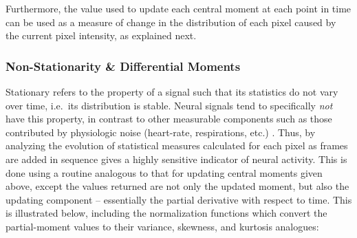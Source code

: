 \documentclass[../main.tex]{subfiles}
\begin{document}



Furthermore, the value used to update each central moment at each point in time can be used as a measure of change in the distribution of each pixel caused by the current pixel intensity, as explained next.

\subsubsection{
	Non-Stationarity \& Differential Moments}\label{non-stationarity-differential-moments}

Stationary refers to the property of a signal such that its statistics do not vary over time, i.e.~its distribution is stable.
Neural signals tend to specifically \emph{not} have this property, in contrast to other measurable components such as those contributed by physiologic noise (heart-rate, respirations, etc.)
.
Thus, by analyzing the evolution of statistical measures calculated for each pixel as frames are added in sequence gives a highly sensitive indicator of neural activity.
This is done using a routine analogous to that for updating central moments given above, except the values returned are not only the updated moment, but also the updating component -- essentially the partial derivative with respect to time.
This is illustrated below, including the normalization functions which convert the partial-moment values to their variance, skewness, and kurtosis analogues:
\end{document}
